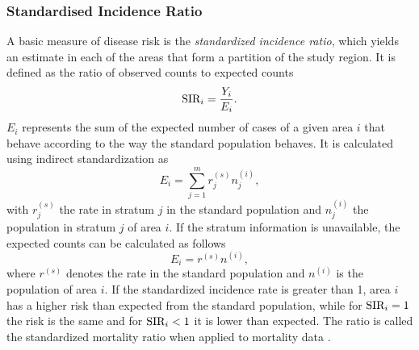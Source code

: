 \subsubsection{Standardised Incidence Ratio}\label{sec:sir}
A basic measure of disease risk is the \textit{standardized incidence ratio}, which yields an estimate in each of the areas that form a partition of the study region. It is defined as the ratio of observed counts to expected counts
\begin{equation}\label{eq:sir}
    \hbox{SIR}_i = \frac{Y_i}{E_i}.
\end{equation}
$E_i$ represents the sum of the expected number of cases of a given area $i$ that behave according to the way the standard population behaves. It is calculated using indirect standardization as
\begin{equation}
    E_i=\sum_{j=1}^mr_j^{(s)}n_j^{(i)},
\end{equation}
with $r_j^{(s)}$ the rate in stratum $j$ in the standard population and $n_j^{(i)}$ the population in stratum $j$ of area $i$. If the stratum information is unavailable, the expected counts can be calculated as follows
\begin{equation*}
    E_i = r^{(s)}n^{(i)},
\end{equation*}
where $r^{(s)}$ denotes the rate in the standard population and $n^{(i)}$ is the population of area $i$. If the standardized incidence rate is greater than 1, area $i$ has a higher risk than expected from the standard population, while for $\hbox{SIR}_i = 1$ the risk is the same and for $\hbox{SIR}_i < 1$ it is lower than expected. The ratio is called the standardized mortality ratio when applied to mortality data \autocite[][]{rioux_grandbastien_astagneau_2006}.
